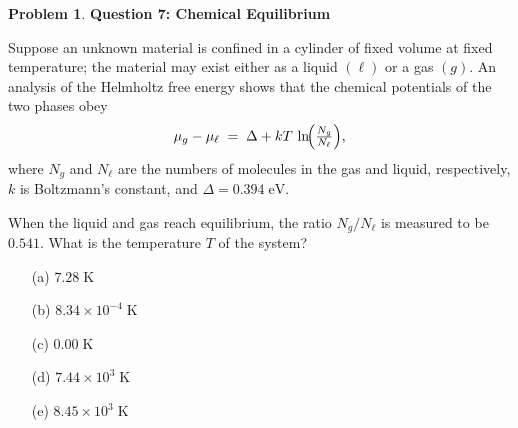 \documentclass[10pt]{article}
\theoremstyle{definition} %
\newtheorem{problem}{Problem}
\theoremstyle{plain} %
\begin{document}
                                          \begin{problem}
                                            \textbf{Question 7: Chemical Equilibrium}
                                            
                                            Suppose an unknown material is confined in a cylinder of fixed volume at fixed
                                            temperature; the material may exist either as a liquid \((\ell)\) or a gas
                                            \((g)\).
                                            An analysis of the Helmholtz free energy shows that the chemical potentials of
                                            the two phases obey
                                            \[
                                               \mu_{g}-\mu_{\ell}
                                                 \;=\;
                                                 \Delta
                                                 + kT\,\ln\!\Bigl(\tfrac{N_{g}}{N_{\ell}}\Bigr),
                                            \]
                                            where \(N_{g}\) and \(N_{\ell}\) are the numbers of molecules in the gas and
                                            liquid, respectively, \(k\) is Boltzmann’s constant, and
                                            \(\Delta = 0.394\;\text{eV}\).
                                            
                                            \medskip
                                            When the liquid and gas reach equilibrium, the ratio \(N_{g}/N_{\ell}\) is
                                            measured to be \(0.541\).
                                            What is the temperature \(T\) of the system?
                                            
                                            \begin{enumerate}
                                              \item[(a)] \(7.28\;\text{K}\)
                                              \item[(b)] \(8.34\times10^{-4}\;\text{K}\)
                                              \item[(c)] \(0.00\;\text{K}\)
                                              \item[(d)] \(7.44\times10^{3}\;\text{K}\)
                                              \item[(e)] \(8.45\times10^{3}\;\text{K}\)
                                            \end{enumerate}
                                            \end{problem}
\end{document}
